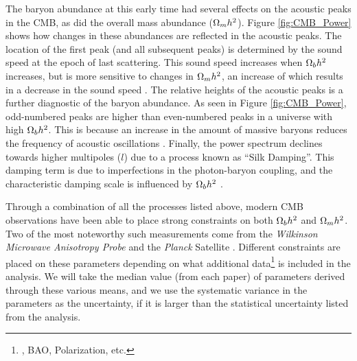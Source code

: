 The baryon abundance at this early time had several effects on the
acoustic peaks in the CMB, as did the overall mass abundance ($\Omega_m
h^2$). Figure \ref{fig:CMB_Power} shows how changes in these
abundances are reflected in the acoustic peaks. The location of the
first peak (and all subsequent peaks) is determined by the sound speed
at the epoch of last scattering. This sound speed increases when
$\Omega_b h^2$ increases, but is more sensitive to changes in $\Omega_m
h^2$, an increase of which results in a decrease in the sound speed
\citep[][ch.~9.8]{Mukhanov2005}. The relative heights of the acoustic
peaks is a further diagnostic of the baryon abundance. As seen in
Figure \ref{fig:CMB_Power}, odd-numbered peaks are higher than
even-numbered peaks in a universe with high $\Omega_b h^2$. This is
because an increase in the amount of massive baryons reduces the
frequency of acoustic oscillations
\citep[][ch.~8.7.3]{Dodelson2003}. Finally, the power spectrum
declines towards higher multipoles ($l$) due to a process known as
``Silk Damping''. This damping term is due to imperfections in the
photon-baryon coupling, and the characteristic damping scale is
influenced by $\Omega_b h^2$ \citep[][ch.~4.7]{Durrer2008}.



Through a combination of all the processes listed above, modern CMB
observations have been able to place strong constraints on both
$\Omega_b h^2$ and $\Omega_m h^2$. Two of the most noteworthy such
measurements come from the \textit{Wilkinson Microwave Anisotropy
  Probe} \citep[WMAP][]{Bennett2003} and the \textit{Planck} Satellite
\citep{PlanckResultsI}. Different constraints are placed on these
parameters depending on what additional data\footnote{\Ho, BAO,
  Polarization, etc.} is included in the analysis. We will take the
median value (from each paper) of parameters derived through these
various means, and we use the systematic variance in the parameters as
the uncertainty, if it is larger than the statistical uncertainty
listed from the analysis.

